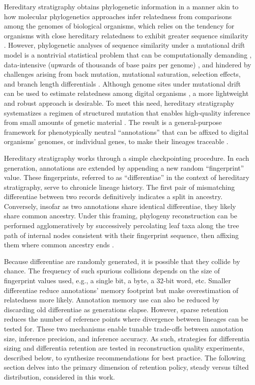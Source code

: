 Hereditary stratigraphy obtains phylogenetic information in a manner akin to how molecular phylogenetics approaches infer relatedness from comparisons among the genomes of biological organisms, which relies on the tendency for organisms with close hereditary relatedness to exhibit greater sequence similarity \citep{yang2012molecular}.
However, phylogenetic analyses of sequence similarity under a mutational drift model is a nontrivial statistical problem \citep{neyman1971molecular} that can be computationally demanding \citep{konno2022deep,stamatakis2013novel}, data-intensive (upwards of thousands of base pairs per genome) \citep{parks2009increasing,cloutier2019whole,wortley2005much}, and hindered by challenges arising from back mutation, mutational saturation, selection effects, and branch length differentials \citep{brocchieri2001phylogenetic,moreira2000molecular}.
Although genome sites under mutational drift can be used to estimate relatedness among digital organisms \citep{moreno2021case}, a more lightweight and robust approach is desirable.
To meet this need, hereditary stratigraphy systematizes a regimen of structured mutation that enables high-quality inference from small amounts of genetic material \citep{moreno2022hereditary}.
The result is a general-purpose framework for phenotypically neutral ``annotations'' that can be affixed to digital organisms' genomes, or individual genes, to make their lineages traceable \citep{moreno2022hstrat}.

Hereditary stratigraphy works through a simple checkpointing procedure.
In each generation, annotations are extended by appending a new random ``fingerprint'' value.
These fingerprints, referred to as ``differentiae'' in the context of hereditary stratigraphy, serve to chronicle lineage history.
The first pair of mismatching differentiae between two records definitively indicates a split in ancestry.
Conversely, insofar as two annotations share identical differentiae, they likely share common ancestry.
Under this framing, phylogeny reconstruction can be performed agglomeratively by successively percolating leaf taxa along the tree path of internal nodes consistent with their fingerprint sequence, then affixing them where common ancestry ends \citep{moreno2024analysis}.

Because differentiae are randomly generated, it is possible that they collide by chance.
The frequency of such spurious collisions depends on the size of fingerprint values used, e.g., a single bit, a byte, a 32-bit word, etc.
Smaller differentiae reduce annotations' memory footprint but make overestimation of relatedness more likely.
Annotation memory use can also be reduced by discarding old differentiae as generations elapse.
However, sparse retention reduces the number of reference points where divergence between lineages can be tested for.
These two mechanisms enable tunable trade-offs between annotation size, inference precision, and inference accuracy.
As such, strategies for differentia sizing and differentia retention are tested in reconstruction quality experiments, described below, to synthesize recommendations for best practice.
The following section delves into the primary dimension of retention policy, steady versus tilted distribution, considered in this work.

